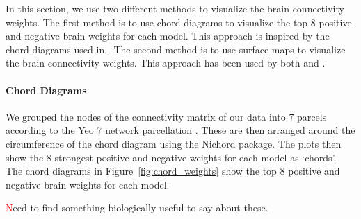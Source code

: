 In this section, we use two different methods to visualize the brain connectivity weights.
The first method is to use chord diagrams to visualize the top 8 positive and negative brain \gls{weights} for each model.
This approach is inspired by the chord diagrams used in \cite{smith2015positive}.
The second method is to use surface maps to visualize the brain connectivity weights.
This approach has been used by both \cite{ferreira2022hierarchical} and \cite{smith2015positive}.

\paragraph{Chord Diagrams}
We grouped the nodes of the connectivity matrix of our data into 7 parcels according to the Yeo 7 network parcellation \cite{yeo2011organization}.
These are then arranged around the circumference of the chord diagram using the Nichord package\citep{bogdan2023connsearch}.
The plots then show the 8 strongest positive and negative \gls{weights} for each model as `chords'.
The chord diagrams in Figure~\ref{fig:chord_weights} show the top 8 positive and negative brain \gls{weights} for each model.

\textcolor{red} Need to find something biologically useful to say about these.

